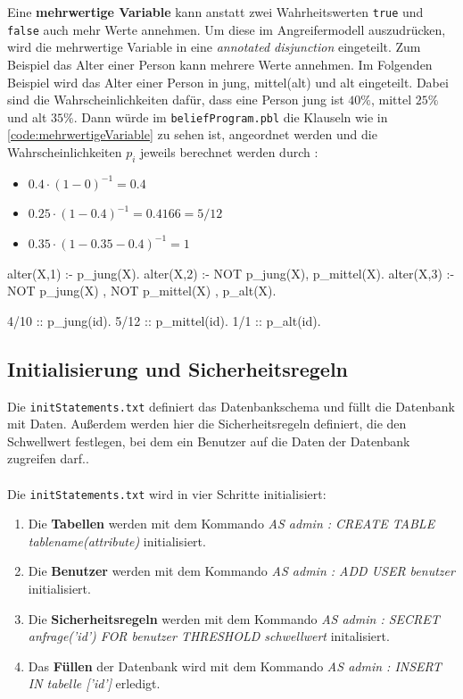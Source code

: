 \documentclass[german,version-2020-11]{uzl-thesis}
\begin{document}
Eine \textbf{mehrwertige Variable} kann anstatt zwei Wahrheitswerten \texttt{true} und \texttt{false} auch mehr Werte annehmen.
Um diese im Angreifermodell auszudrücken, wird die mehrwertige Variable in eine \textit{annotated disjunction} eingeteilt. Zum Beispiel das Alter einer Person kann mehrere Werte annehmen. Im Folgenden Beispiel wird das Alter einer Person in jung, mittel(alt) und alt eingeteilt. Dabei sind die Wahrscheinlichkeiten dafür, dass eine Person jung ist $40\%$, mittel $25\%$ und alt $35\%$. Dann würde im \texttt{beliefProgram.pbl} die Klauseln wie in \autoref{code:mehrwertigeVariable} zu sehen ist, angeordnet werden und die Wahrscheinlichkeiten $p_i$ jeweils berechnet werden durch : 
\begin{itemize}
	\item $0.4 \cdot (1- 0)^{-1} = 0.4 $
	\item  $0.25 \cdot (1 - 0.4)^{-1} = 0.4166 = 5/12 $
	\item $ 0.35 \cdot (1 - 0.35 - 0.4)^{-1} = 1 $
\end{itemize}
\begin{Pseudocode}[caption={Beispiel für mehrwertige Variable}, label={code:mehrwertigeVariable}]
alter(X,1) :- p_jung(X).
alter(X,2) :- NOT p_jung(X), p_mittel(X).
alter(X,3) :- NOT p_jung(X) , NOT p_mittel(X) , p_alt(X).

4/10 :: p_jung(id).
5/12 :: p_mittel(id).
1/1 :: p_alt(id).
\end{Pseudocode} 


\subsection{Initialisierung und Sicherheitsregeln}
Die \texttt{initStatements.txt} definiert das Datenbankschema und füllt die Datenbank mit Daten. Außerdem werden hier die Sicherheitsregeln definiert, die den Schwellwert festlegen, bei dem ein Benutzer auf die Daten der Datenbank zugreifen darf.. \\ \\  
Die \texttt{initStatements.txt} wird in vier Schritte initialisiert:
\begin{enumerate}
	\item Die \textbf{Tabellen } werden mit dem Kommando \textit{AS admin : CREATE TABLE tablename(attribute)} initialisiert. 
	\item  Die \textbf{Benutzer} werden mit dem Kommando \textit{AS admin : ADD USER benutzer} initialisiert. 
	\item Die \textbf{Sicherheitsregeln}  werden mit dem Kommando \textit{AS admin : SECRET anfrage('id') FOR benutzer THRESHOLD schwellwert} initalisiert.
	\item Das \textbf{Füllen} der Datenbank wird mit dem Kommando \textit{AS admin : INSERT IN tabelle ['id']} erledigt.
\end{enumerate} 
\end{document}
